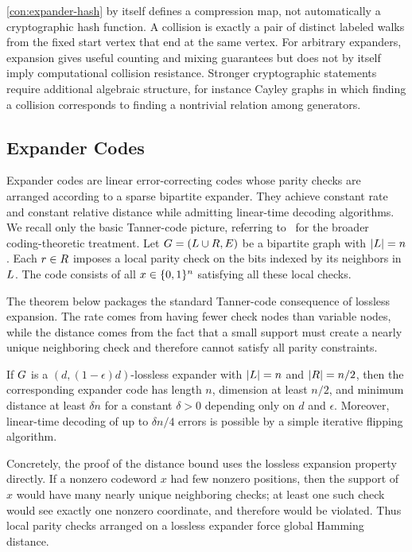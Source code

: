 \cref{con:expander-hash} by itself defines a compression map, not automatically a cryptographic hash function. A collision is exactly a pair of distinct labeled walks from the fixed start vertex that end at the same vertex. For arbitrary expanders, expansion gives useful counting and mixing guarantees but does not by itself imply computational collision resistance. Stronger cryptographic statements require additional algebraic structure, for instance Cayley graphs in which finding a collision corresponds to finding a nontrivial relation among generators.

\subsection{Expander Codes}
\label{subsec:expander-codes}

Expander codes are linear error-correcting codes whose parity checks are arranged according to a sparse bipartite expander. They achieve constant rate and constant relative distance while admitting linear-time decoding algorithms. We recall only the basic Tanner-code picture, referring to~\cite{HLW2006} for the broader coding-theoretic treatment. Let \(G=(L\cup R,E)\) be a bipartite graph with \(\lvert L\rvert=n\). Each \(r\in R\) imposes a local parity check on the bits indexed by its neighbors in \(L\). The code consists of all \(x\in\{0,1\}^n\) satisfying all these local checks.

The theorem below packages the standard Tanner-code consequence of lossless expansion. The rate comes from having fewer check nodes than variable nodes, while the distance comes from the fact that a small support must create a nearly unique neighboring check and therefore cannot satisfy all parity constraints.

\begin{theorem}
	\label{thm:expander-code}
	If \(G\) is a \((d,(1-\epsilon)d)\)-lossless expander with \(\lvert L\rvert=n\) and \(\lvert R\rvert=n/2\), then the corresponding expander code has length \(n\), dimension at least \(n/2\), and minimum distance at least \(\delta n\) for a constant \(\delta>0\) depending only on \(d\) and \(\epsilon\). Moreover, linear-time decoding of up to \(\delta n/4\) errors is possible by a simple iterative flipping algorithm.
\end{theorem}

Concretely, the proof of the distance bound uses the lossless expansion property directly. If a nonzero codeword \(x\) had few nonzero positions, then the support of \(x\) would have many nearly unique neighboring checks; at least one such check would see exactly one nonzero coordinate, and therefore would be violated. Thus local parity checks arranged on a lossless expander force global Hamming distance.

